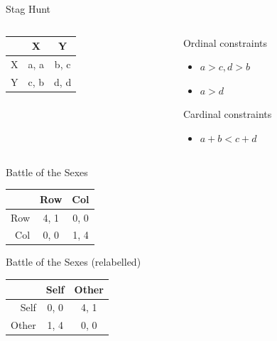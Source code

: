 \documentclass[
  14pt,
  letterpaper,
  ignorenonframetext,
  aspectratio=169,
]{beamer}
\providecommand{\tightlist}{%
  \setlength{\itemsep}{0pt}\setlength{\parskip}{0pt}}\usepackage{longtable,booktabs,array}
\let\olditem\item
\renewcommand{\item}{%
\olditem\vspace{6pt}}
\begin{document}
\begin{frame}[fragile]{Stag Hunt}
\protect\hypertarget{stag-hunt-1}{}
\begin{columns}[T]
\begin{column}{0.4\textwidth}
\begin{table}[!h]
\centering
\begin{tabular}[t]{>{}r|cc}
\toprule
 & X & Y\\
\midrule
X & a, a & b, c\\
Y & c, b & d, d\\
\bottomrule
\end{tabular}
\end{table}
\end{column}

\begin{column}{0.6\textwidth}
Ordinal constraints

\begin{itemize}
\tightlist
\item
  \(a > c, d > b\)
\item
  \(a > d\)
\end{itemize}

Cardinal constraints

\begin{itemize}
\tightlist
\item
  \(a + b < c + d\)
\end{itemize}
\end{column}
\end{columns}
\end{frame}

\begin{frame}[fragile]{Battle of the Sexes}
\protect\hypertarget{battle-of-the-sexes}{}
\begin{table}[!h]
\centering
\begin{tabular}[t]{>{}r|cc}
\toprule
 & Row & Col\\
\midrule
Row & 4, 1 & 0, 0\\
Col & 0, 0 & 1, 4\\
\bottomrule
\end{tabular}
\end{table}
\end{frame}

\begin{frame}[fragile]{Battle of the Sexes (relabelled)}
\protect\hypertarget{battle-of-the-sexes-relabelled}{}
\begin{table}[!h]
\centering
\begin{tabular}[t]{>{}r|cc}
\toprule
 & Self & Other\\
\midrule
Self & 0, 0 & 4, 1\\
Other & 1, 4 & 0, 0\\
\bottomrule
\end{tabular}
\end{table}
\end{frame}
\end{document}
